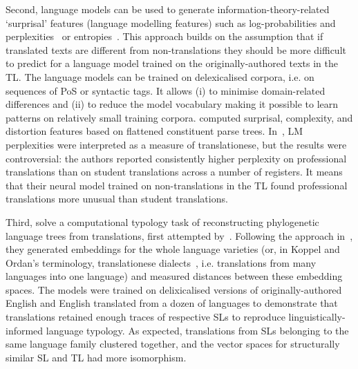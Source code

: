 Second, language models can be used to generate information-theory-related `surprisal' features (language modelling features) such as log-probabilities and perplexities~\cite{Rubino2016,Bizzoni2021,Pylypenko2021} or entropies~\cite{Nikolaev2020,Hu2021}. This approach builds on the assumption that if translated texts are different from non-translations they should be more difficult to predict for a language model trained on the originally-authored texts in the TL. The language models can be trained on delexicalised corpora, i.e. on sequences of PoS or syntactic tags. It allows (i) to minimise domain-related differences and (ii) to reduce the model vocabulary making it possible to learn patterns on relatively small training corpora. \citet{Rubino2016} computed surprisal, complexity, and distortion features based on flattened constituent parse trees.
In~\citet{Bizzoni2021}, \gls{LM} perplexities were interpreted as a measure of translationese, but the results were controversial: the authors reported consistently higher perplexity on professional translations than on student translations across a number of registers. It means that their neural model trained on non-translations in the TL found professional translations more unusual than student translations.


Third, \citet{Chowdhury2020,Chowdhury2021} solve a computational typology task of reconstructing phylogenetic language trees from translations, first attempted by~\citet{Rabinovich2017}. Following the approach in~\citet{Bjerva2019}, they generated embeddings for the whole language varieties (or, in Koppel and Ordan's terminology, translationese dialects~\cite{Koppel2011}, i.e. translations from many languages into one language) and measured distances between these embedding spaces. The models were trained on delixicalised versions of originally-authored English and English translated from a dozen of languages to demonstrate that translations retained enough traces of respective SLs to reproduce linguistically-informed language typology. As expected, translations from SLs belonging to the same language family clustered together, and the vector spaces for structurally similar SL and TL had more isomorphism. 


